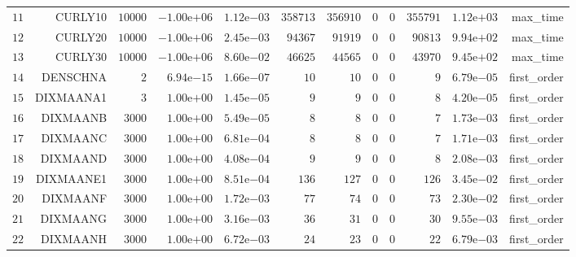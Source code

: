 \begin{longtable}{rrrrrrrrrrrr}
  \(    11\) & CURLY10 & \( 10000\) & \(-1.00\)e\(+06\) & \( 1.12\)e\(-03\) & \(358713\) & \(356910\) & \(     0\) & \(     0\) & \(355791\) & \( 1.12\)e\(+03\) & max\_time \\
  \(    12\) & CURLY20 & \( 10000\) & \(-1.00\)e\(+06\) & \( 2.45\)e\(-03\) & \( 94367\) & \( 91919\) & \(     0\) & \(     0\) & \( 90813\) & \( 9.94\)e\(+02\) & max\_time \\
  \(    13\) & CURLY30 & \( 10000\) & \(-1.00\)e\(+06\) & \( 8.60\)e\(-02\) & \( 46625\) & \( 44565\) & \(     0\) & \(     0\) & \( 43970\) & \( 9.45\)e\(+02\) & max\_time \\
  \(    14\) & DENSCHNA & \(     2\) & \( 6.94\)e\(-15\) & \( 1.66\)e\(-07\) & \(    10\) & \(    10\) & \(     0\) & \(     0\) & \(     9\) & \( 6.79\)e\(-05\) & first\_order \\
  \(    15\) & DIXMAANA1 & \(     3\) & \( 1.00\)e\(+00\) & \( 1.45\)e\(-05\) & \(     9\) & \(     9\) & \(     0\) & \(     0\) & \(     8\) & \( 4.20\)e\(-05\) & first\_order \\
  \(    16\) & DIXMAANB & \(  3000\) & \( 1.00\)e\(+00\) & \( 5.49\)e\(-05\) & \(     8\) & \(     8\) & \(     0\) & \(     0\) & \(     7\) & \( 1.73\)e\(-03\) & first\_order \\
  \(    17\) & DIXMAANC & \(  3000\) & \( 1.00\)e\(+00\) & \( 6.81\)e\(-04\) & \(     8\) & \(     8\) & \(     0\) & \(     0\) & \(     7\) & \( 1.71\)e\(-03\) & first\_order \\
  \(    18\) & DIXMAAND & \(  3000\) & \( 1.00\)e\(+00\) & \( 4.08\)e\(-04\) & \(     9\) & \(     9\) & \(     0\) & \(     0\) & \(     8\) & \( 2.08\)e\(-03\) & first\_order \\
  \(    19\) & DIXMAANE1 & \(  3000\) & \( 1.00\)e\(+00\) & \( 8.51\)e\(-04\) & \(   136\) & \(   127\) & \(     0\) & \(     0\) & \(   126\) & \( 3.45\)e\(-02\) & first\_order \\
  \(    20\) & DIXMAANF & \(  3000\) & \( 1.00\)e\(+00\) & \( 1.72\)e\(-03\) & \(    77\) & \(    74\) & \(     0\) & \(     0\) & \(    73\) & \( 2.30\)e\(-02\) & first\_order \\
  \(    21\) & DIXMAANG & \(  3000\) & \( 1.00\)e\(+00\) & \( 3.16\)e\(-03\) & \(    36\) & \(    31\) & \(     0\) & \(     0\) & \(    30\) & \( 9.55\)e\(-03\) & first\_order \\
  \(    22\) & DIXMAANH & \(  3000\) & \( 1.00\)e\(+00\) & \( 6.72\)e\(-03\) & \(    24\) & \(    23\) & \(     0\) & \(     0\) & \(    22\) & \( 6.79\)e\(-03\) & first\_order \\

\end{longtable}
